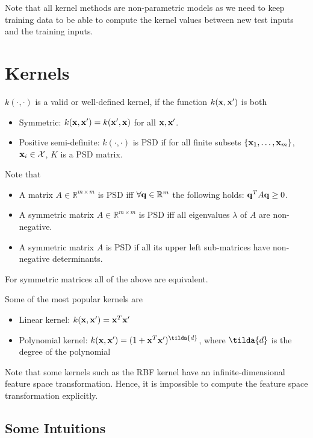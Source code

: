 Note that all kernel methods are non-parametric models as we need to keep training data to be able to compute the kernel values between new test inputs and the training inputs.

\section{Kernels}
\label{sec:kernel:kernel_def}

$k(\cdot, \cdot)$ is a valid or well-defined kernel, if the function $k({\mathbf{x}}, {\mathbf{x}}')$ is both 
\begin{itemize}
	\item Symmetric: $k({\mathbf{x}}, {\mathbf{x}}') = k({\mathbf{x}}', {\mathbf{x}})$ for all ${\mathbf{x}}, {\mathbf{x}}'$.
	\item Positive semi-definite: $k(\cdot, \cdot)$ is PSD if for all finite subsets $\{{\mathbf{x}}_1,\dots,{\mathbf{x}}_m\}$, ${\mathbf{x}}_i\in \mathcal{X}$, $K$ is a PSD matrix. 
\end{itemize}

Note that 
\begin{itemize}
	\item A matrix $A\in \mathbb{R}^{m\times m}$ is PSD iff $\forall {\mathbf{q}}\in \mathbb{R}^m$ the following holds: ${\mathbf{q}}^TA{\mathbf{q}}\geq 0$.
	\item A symmetric matrix $A\in \mathbb{R}^{m\times m}$ is PSD iff all eigenvalues $\lambda$ of $A$ are non-negative. 
	\item A symmetric matrix $A$ is PSD if all its upper left sub-matrices have non-negative determinants.
\end{itemize}

For symmetric matrices all of the above are equivalent. 

Some of the most popular kernels are
\begin{itemize}
	\item Linear kernel: $k({\mathbf{x}}, {\mathbf{x}}') = {\mathbf{x}}^T{\mathbf{x}}'$
	\item Polynomial kernel: $k(\rvx, \rvx') = (1+\rvx^T\rvx')^{\tilda{d}}$, where $\tilda{d}$ is the degree of the polynomial
\end{itemize}

Note that some kernels such as the RBF kernel have an infinite-dimensional feature space transformation. Hence, it is impossible to compute the feature space transformation explicitly. 

\subsection{Some Intuitions}

